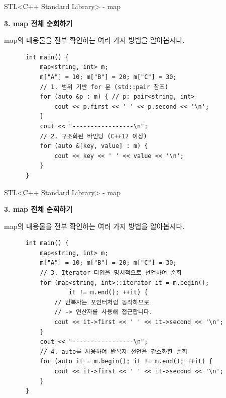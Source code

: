 \begin{frame}[fragile]{STL}{<C++ Standard Library> - map}
  \begin{twocol}
    \vspace{8mm}
    \textbf{3. map 전체 순회하기}\par\vspace{2mm}
    map의 내용물을 전부 확인하는 여러 가지 방법을 알아봅시다.
  \colsplit
    \begin{verbatim}
      int main() {
          map<string, int> m;
          m["A"] = 10; m["B"] = 20; m["C"] = 30;
          // 1. 범위 기반 for 문 (std::pair 참조)
          for (auto &p : m) { // p: pair<string, int>
              cout << p.first << ' ' << p.second << '\n';
          }
          cout << "-----------------\n";
          // 2. 구조화된 바인딩 (C++17 이상)
          for (auto &[key, value] : m) {
              cout << key << ' ' << value << '\n';
          }
      }
    \end{verbatim}
  \end{twocol}
\end{frame}

\begin{frame}[fragile]{STL}{<C++ Standard Library> - map}
  \begin{twocol}
    \vspace{8mm}
    \textbf{3. map 전체 순회하기}\par\vspace{2mm}
    map의 내용물을 전부 확인하는 여러 가지 방법을 알아봅시다.
  \colsplit
    \begin{verbatim}
      int main() {
          map<string, int> m;
          m["A"] = 10; m["B"] = 20; m["C"] = 30;
          // 3. Iterator 타입을 명시적으로 선언하여 순회
          for (map<string, int>::iterator it = m.begin();
                  it != m.end(); ++it) {
              // 반복자는 포인터처럼 동작하므로
              // -> 연산자를 사용해 접근합니다.
              cout << it->first << ' ' << it->second << '\n';
          }
          cout << "-----------------\n";
          // 4. auto를 사용하여 반복자 선언을 간소화한 순회
          for (auto it = m.begin(); it != m.end(); ++it) {
              cout << it->first << ' ' << it->second << '\n';
          }
      }
    \end{verbatim}
  \end{twocol}
\end{frame}

